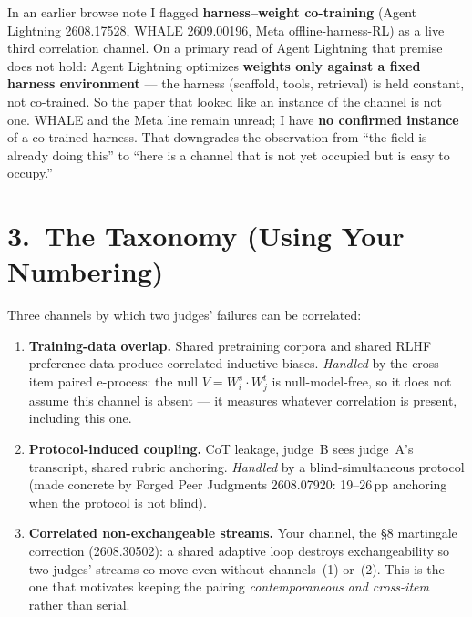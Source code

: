 \documentclass[11pt,a4paper]{article}
\begin{document}
In an earlier browse note I flagged \textbf{harness--weight co-training}
(Agent Lightning 2608.17528, WHALE 2609.00196, Meta offline-harness-RL) as a
live third correlation channel.  On a primary read of Agent Lightning that
premise does not hold: Agent Lightning optimizes \textbf{weights only against a
fixed harness environment} --- the harness (scaffold, tools, retrieval) is held
constant, not co-trained.  So the paper that looked like an instance of the
channel is not one.  WHALE and the Meta line remain unread; I have \textbf{no
confirmed instance} of a co-trained harness.  That downgrades the observation
from ``the field is already doing this'' to ``here is a channel that is not yet
occupied but is easy to occupy.''

\section*{3.\ The Taxonomy (Using Your Numbering)}

Three channels by which two judges' failures can be correlated:

\begin{enumerate}[label=\textbf{\arabic*.}]
  \item \textbf{Training-data overlap.}
    Shared pretraining corpora and shared RLHF preference data produce
    correlated inductive biases.
    \emph{Handled} by the cross-item paired e-process: the null
    $V = W_i^s \cdot W_j^t$ is null-model-free, so it does not assume this
    channel is absent --- it measures whatever correlation is present,
    including this one.

  \item \textbf{Protocol-induced coupling.}
    CoT leakage, judge~B sees judge~A's transcript, shared rubric anchoring.
    \emph{Handled} by a blind-simultaneous protocol (made concrete by
    Forged Peer Judgments 2608.07920: 19--26\,pp anchoring when the protocol
    is not blind).

  \item \textbf{Correlated non-exchangeable streams.}
    Your channel, the \S8 martingale correction (2608.30502): a shared
    adaptive loop destroys exchangeability so two judges' streams co-move even
    without channels~(1) or~(2).  This is the one that motivates keeping the
    pairing \emph{contemporaneous and cross-item} rather than serial.
\end{enumerate}
\end{document}
